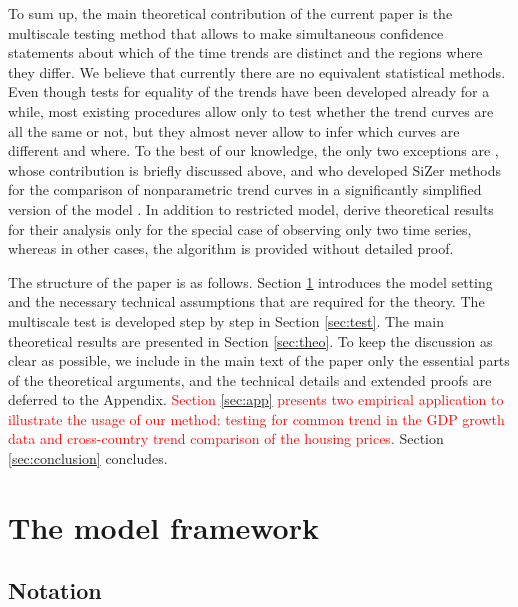 \documentclass[a4paper,12pt]{article}
\makeatletter
\renewcommand{\eqref}[1]{\tagform@{\ref{#1}}}
\makeatother
\begin{document}
To sum up, the main theoretical contribution of the current paper is the multiscale testing method that allows to make simultaneous confidence statements about which of the time trends are distinct and the regions where they differ. We believe that currently there are no equivalent statistical methods. Even though tests for equality of the trends have been developed already for a while, most existing procedures allow only to test whether the trend curves are all the same or not, but they almost never allow to infer which curves are different and where. To the best of our knowledge, the only two exceptions are \cite{KhismatullinaVogt2021}, whose contribution is briefly discussed above, and \cite{Park2009} who developed SiZer methods for the comparison of nonparametric trend curves in a significantly simplified version of the model \eqref{eq:model}. In addition to restricted model, \cite{Park2009} derive theoretical results for their analysis only for the special case of observing only two time series, whereas in other cases, the algorithm is provided without detailed proof.

The structure of the paper is as follows. Section \ref{sec:model} introduces the model setting and the necessary technical assumptions that are required for the theory. The multiscale test is developed step by step in Section \ref{sec:test}. The main theoretical results are presented in Section \ref{sec:theo}. To keep the discussion as clear as possible, we include in the main text of the paper only the essential parts of the theoretical arguments, and the technical details and extended proofs are deferred to the Appendix. \textcolor{red}{Section \ref{sec:app} presents two empirical application to illustrate the usage of our method: testing for common trend in the GDP growth data and cross-country trend comparison of the housing prices.} Section \ref{sec:conclusion} concludes.



\section{The model framework}\label{sec:model}


\subsection{Notation}


\end{document}
